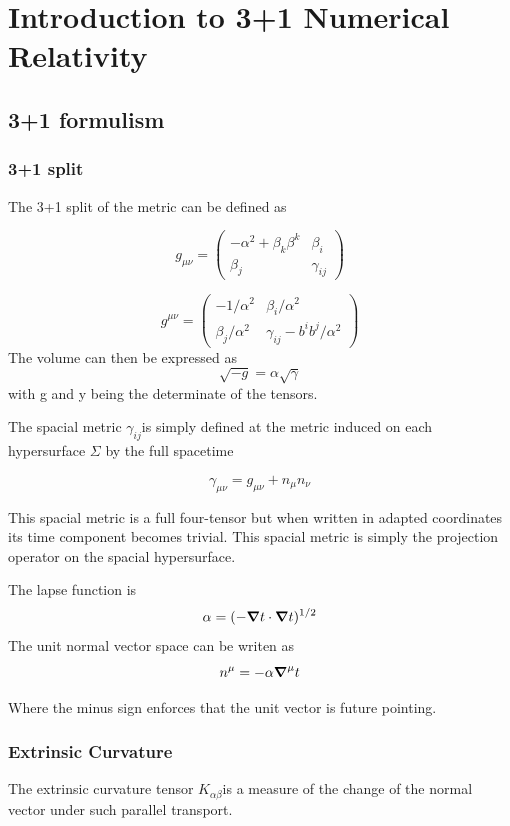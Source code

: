 \chapter{Introduction to 3+1 Numerical Relativity}
\section{3+1 formulism}
\subsection{3+1 split}
The 3+1 split of the metric can be defined as

\[
    g_{\mu \nu} =
\begin{pmatrix}
-\alpha^2 + \beta_k \beta^k & \beta_i \\
\beta_j & \gamma_{ij}
\end{pmatrix}
\]

\[
    g^{\mu \nu} =
\begin{pmatrix}
-1 / \alpha^2  & \beta_i/\alpha^2 \\
\beta_j/ \alpha^2 & \gamma_{ij} - b^i b^j / \alpha^2
\end{pmatrix}
\]
The volume can then be expressed as
\[
\sqrt{-g} = \alpha \sqrt{\gamma}
  \]
  with g and y being the determinate of the tensors.

  The spacial metric $\gamma_{ij}$is simply defined at the metric induced on each hypersurface $\Sigma$ by the full spacetime

\[
  \gamma_{\mu \nu} = g_{\mu \nu} + n_\mu n_\nu
  \]

  This spacial metric is a full four-tensor but when written in adapted coordinates its time component becomes trivial. This spacial metric is simply the projection operator on the spacial hypersurface.

  The lapse function is
\[
\alpha = (- \grad t \cdot \grad t)^{1/2}
  \]
  The unit normal vector space can be writen as
\[
n^\mu = -\alpha \grad^\mu t
  \]

  Where the minus sign enforces that the unit vector is future pointing.

\subsection{Extrinsic Curvature}

The extrinsic curvature tensor $K_{\alpha \beta}$is a measure of the change of the normal vector under such parallel transport.

